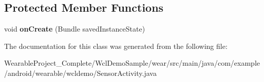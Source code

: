 \subsection*{Protected Member Functions}
\begin{DoxyCompactItemize}
\item 
void {\bfseries on\+Create} (Bundle saved\+Instance\+State)\hypertarget{classcom_1_1example_1_1android_1_1wearable_1_1wcldemo_1_1SensorActivity_adf4a89a9b679107320d44dfb8e426fa8}{}\label{classcom_1_1example_1_1android_1_1wearable_1_1wcldemo_1_1SensorActivity_adf4a89a9b679107320d44dfb8e426fa8}

\end{DoxyCompactItemize}


The documentation for this class was generated from the following file\+:\begin{DoxyCompactItemize}
\item 
Wearable\+Project\+\_\+\+Complete/\+Wcl\+Demo\+Sample/wear/src/main/java/com/example/android/wearable/wcldemo/Sensor\+Activity.\+java\end{DoxyCompactItemize}
